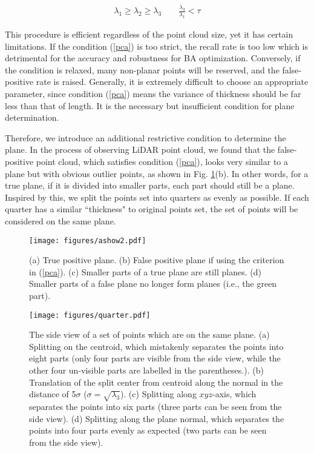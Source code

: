\documentclass[letterpaper, 10 pt, conference]{ieeeconf}  %
\begin{document}
\begin{align}
	\lambda_1 \ge \lambda_2 \ge \lambda_3 \qquad
	\frac{\lambda_3}{\lambda_1} < \tau \label{pca}
\end{align}

This procedure is efficient regardless of the point cloud size, yet it has certain limitations. If the condition (\ref{pca}) is too strict, the recall rate is too low which is detrimental for the accuracy and robustness for BA optimization. Conversely, if the condition is relaxed, many non-planar points will be reserved, and the false-positive rate is raised. Generally, it is extremely difficult to choose an appropriate parameter, since condition (\ref{pca}) means the variance of thickness should be far less than that of length. It is the necessary but insufficient condition for plane determination. 

Therefore, we introduce an additional restrictive condition to determine the plane. In the process of observing LiDAR point cloud, we found that the false-positive point cloud, which satisfies condition (\ref{pca}), looks very similar to a plane but with obvious outlier points, as shown in Fig. \ref{fig positive}(b). In other words, for a true plane, if it is divided into smaller parts, each part should still be a plane. Inspired by this, we split the points set into quarters as evenly as possible. If each quarter has a similar ``thickness" to original points set, the set of points will be considered on the same plane. 

\begin{figure} [t]
	\centering
	\texttt{[image: figures/ashow2.pdf]}
    \caption{(a) True positive plane. (b) False positive plane if using the criterion in (\ref{pca}). (c) Smaller parts of a true plane are still planes. (d) Smaller parts of a false plane no longer form planes (i.e., the green part). }
    \label{fig positive}
\end{figure}

\begin{figure} [ht]
    \centering
    \texttt{[image: figures/quarter.pdf]}
    \caption{The side view of a set of points which are on the same plane. (a) Splitting on the centroid, which mistakenly separates the points into eight parts (only four parts are visible from the side view, while the other four un-visible parts are labelled in the parentheses.). (b) Translation of the split center from centroid along the normal in the distance of 5$\sigma$ ($\sigma = \sqrt{\lambda_3}$). (c) Splitting along $xyz$-axis, which separates the points into six parts (three parts can be seen from the side view). (d) Splitting along the plane normal, which separates the points into four parts evenly as expected (two parts can be seen from the side view).}
    \label{fig quarter}
\end{figure}
\end{document}
